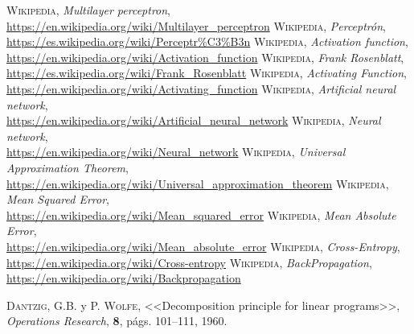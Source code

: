\documentclass[a4paper, 11pt]{article}
\begin{document}
\newpage
\begin{thebibliography}{X}
 \textsc{Wikipedia},
\textit{Multilayer perceptron},\\ \url{https://en.wikipedia.org/wiki/Multilayer_perceptron}
 \textsc{Wikipedia},
\textit{Perceptrón},\\ \url{https://es.wikipedia.org/wiki/Perceptr%C3%B3n}
 \textsc{Wikipedia},
\textit{Activation function},\\ \url{https://en.wikipedia.org/wiki/Activation_function}
 \textsc{Wikipedia},
\textit{Frank Rosenblatt},\\ \url{https://es.wikipedia.org/wiki/Frank_Rosenblatt}
 \textsc{Wikipedia},
\textit{Activating Function},\\ \url{https://en.wikipedia.org/wiki/Activating_function}
 \textsc{Wikipedia},
\textit{Artificial neural network},\\ \url{https://en.wikipedia.org/wiki/Artificial_neural_network}
 \textsc{Wikipedia},
\textit{Neural network},\\ \url{https://en.wikipedia.org/wiki/Neural_network}
 \textsc{Wikipedia},
\textit{Universal Approximation Theorem},\\ \url{https://en.wikipedia.org/wiki/Universal_approximation_theorem}
 \textsc{Wikipedia},
\textit{Mean Squared Error},\\ \url{https://en.wikipedia.org/wiki/Mean_squared_error}
 \textsc{Wikipedia},
\textit{Mean Absolute Error},\\ \url{https://en.wikipedia.org/wiki/Mean_absolute_error}
 \textsc{Wikipedia},
\textit{Cross-Entropy},\\ \url{https://en.wikipedia.org/wiki/Cross-entropy}
 \textsc{Wikipedia},
\textit{BackPropagation},\\ \url{https://en.wikipedia.org/wiki/Backpropagation}

 \textsc{Dantzig, G.B.} y \textsc{P. Wolfe},
<<Decomposition principle for linear programs>>,
\textit{Operations Research}, \textbf{8}, págs. 101--111, 1960.

\end{thebibliography}
\end{document}

